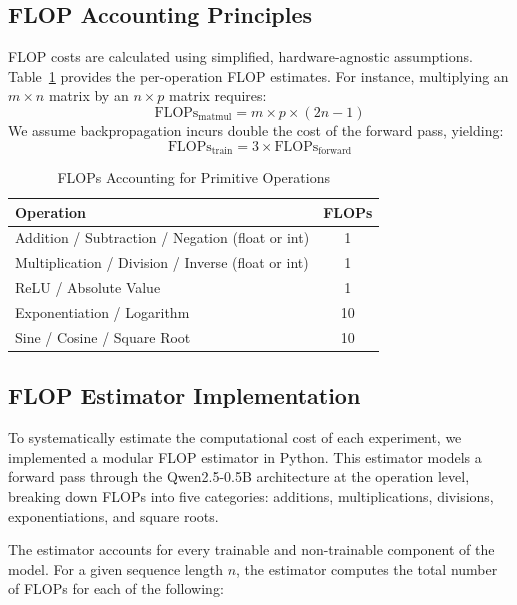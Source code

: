 \documentclass[a4paper,12pt]{article}
\begin{document}
\subsection*{FLOP Accounting Principles}

FLOP costs are calculated using simplified, hardware-agnostic assumptions. Table~\ref{tab:flops_primitives} provides the per-operation FLOP estimates. For instance, multiplying an $m \times n$ matrix by an $n \times p$ matrix requires:
\begin{equation}
\text{FLOPs}_{\text{matmul}} = m \times p \times (2n - 1)
\end{equation}
We assume backpropagation incurs double the cost of the forward pass, yielding:
\begin{equation}
\text{FLOPs}_{\text{train}} = 3 \times \text{FLOPs}_{\text{forward}}
\end{equation}

\begin{table}[h]
  \centering
  \caption{FLOPs Accounting for Primitive Operations}
  \label{tab:flops_primitives}
  \begin{tabular}{lc}
    \hline
    Operation & FLOPs \\
    \hline
    Addition / Subtraction / Negation (float or int) & 1 \\
    Multiplication / Division / Inverse (float or int) & 1 \\
    ReLU / Absolute Value & 1 \\
    Exponentiation / Logarithm & 10 \\
    Sine / Cosine / Square Root & 10 \\
    \hline
  \end{tabular}
\end{table}

\subsection*{FLOP Estimator Implementation}

To systematically estimate the computational cost of each experiment, we implemented a modular FLOP estimator in Python. This estimator models a forward pass through the Qwen2.5-0.5B architecture at the operation level, breaking down FLOPs into five categories: additions, multiplications, divisions, exponentiations, and square roots.

The estimator accounts for every trainable and non-trainable component of the model. For a given sequence length $n$, the estimator computes the total number of FLOPs for each of the following:
\end{document}

